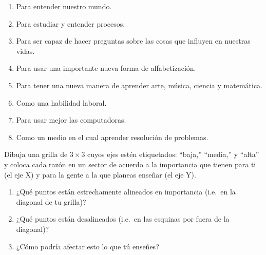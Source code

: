 \begin{enumerate}

\item
 Para entender nuestro mundo.

\item
 Para estudiar y entender procesos.

\item
 Para ser capaz de hacer preguntas sobre las cosas que influyen en nuestras vidas.

\item
Para usar una importante nueva forma de alfabetización.

\item
 Para tener una nueva manera de aprender arte, música, ciencia y matemática.

\item
 Como una habilidad laboral.

\item
 Para usar mejor las computadoras. 

\item
 Como un medio en el cual aprender resolución de problemas.

\end{enumerate}

Dibuja una grilla de $3{\times}3$ cuyos ejes estén etiquetados: ``baja,'' ``media,'' y ``alta''
y coloca cada razón en un sector
de acuerdo a la importancia que tienen para ti (el eje X)
y para la gente a la que planeas enseñar (el eje Y).

\begin{enumerate}

\item
 ¿Qué puntos están estrechamente alineados en importancia
 (i.e.\ en la diagonal de tu grilla)?

\item
¿Qué puntos están desalineados
 (i.e.\ en las esquinas por fuera de la diagonal)?

\item
 ¿Cómo podría afectar esto lo que tú enseñes?

\end{enumerate}
